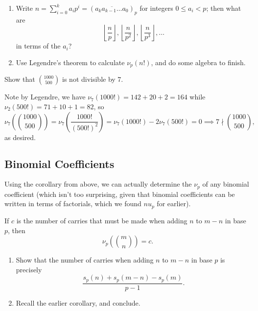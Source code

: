 \documentclass[blue,onecol]{shooting}
\begin{document}
\begin{walk}
    \begin{enumerate}
        \item Write $n=\sum_{i=0}^k a_ip^i=\left( \overline{a_ka_{k-1}\dots a_0} \right)_p$ for integers $0\leq a_i<p$; then what are \[\left\lfloor \frac np \right\rfloor,\left\lfloor \frac n{p^2} \right\rfloor,\left\lfloor \frac n{p^3} \right\rfloor,\dots\] in terms of the $a_i$?
        \item Use Legendre's theorem to calculate $\nu_p(n!)$, and do some algebra to finish.
    \end{enumerate}
\end{walk}

\begin{exam}
    Show that $\binom{1000}{500}$ is not divisible by 7.
\end{exam}

\begin{sol}
    Note by Legendre, we have $\nu_7(1000!)=142+20+2=164$ while $\nu_2(500!)=71+10+1=82$, so \[\nu_7\left( \binom{1000}{500} \right)=\nu_7\left( \frac{1000!}{(500!)^2} \right)=\nu_7(1000!)-2\nu_7(500!)=0\implies 7\nmid \binom{1000}{500},\] as desired.
\end{sol}

\subsection{Binomial Coefficients}
Using the corollary from above, we can actually determine the $\nu_p$ of any binomial coefficient (which isn't too surprising, given that binomial coefficients can be written in terms of factorials, which we found $nu_p$ for earlier).

\begin{theo}[Kummer]
    If $c$ is the number of carries that must be made when adding $n$ to $m-n$ in base $p$, then \[\nu_p\left( \binom mn \right)=c.\]
\end{theo}

\begin{walk}
    \begin{enumerate}
        \item Show that the number of carries when adding $n$ to $m-n$ in base $p$ is precisely \[\frac{s_p(n)+s_p(m-n)-s_p(m)}{p-1}.\]
        \item Recall the earlier corollary, and conclude.
    \end{enumerate}
\end{walk}
\end{document}
